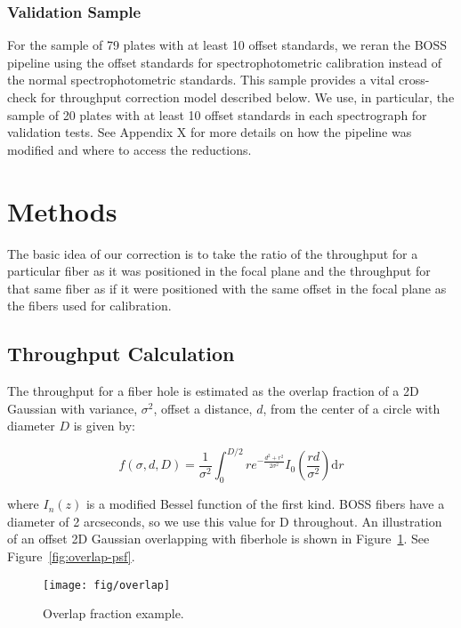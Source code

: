 \documentclass{emulateapj}
\providecommand{\fig}[1]{Figure~\ref{fig:#1}}
\begin{document}
\subsubsection{Validation Sample}

For the sample of 79 plates with at least 10 offset standards, we reran the BOSS pipeline using the offset standards for spectrophotometric calibration instead of the normal spectrophotometric standards. This sample provides a vital cross-check for throughput correction model described below. We use, in particular, the sample of 20 plates with at least 10 offset standards in each spectrograph for validation tests. See Appendix X for more details on how the pipeline was modified and where to access the reductions.

\section{Methods}

The basic idea of our correction is to take the ratio of the throughput for a particular fiber as it was positioned in the focal plane and the throughput for that same fiber as if it were positioned with the same offset in the focal plane as the fibers used for calibration.

\subsection{Throughput Calculation}

The throughput for a fiber hole is estimated as the overlap fraction of a 2D Gaussian with variance, $\sigma^2$, offset a distance, $d$, from the center of a circle with diameter $D$ is given by:

\begin{equation}
\label{eq:overlap}
f(\sigma,d,D) = \frac{1}{\sigma ^2}\int_{0}^{D/2}  r e^{-\frac{d^2+r^2}{2 \sigma ^2}} I_{0}\left(\frac{r d}{\sigma ^2}\right) \mathrm{d}r
\end{equation}

where $I_n(z)$ is a modified Bessel function of the first kind. BOSS fibers have a diameter of 2 arcseconds, so we use this value for D throughout. An illustration of an offset 2D Gaussian overlapping with fiberhole is shown in \fig{overlap-demo}. See \fig{overlap-psf}.

\begin{figure}
\centering
\texttt{[image: fig/overlap]}
\caption{Overlap fraction example.}
\label{fig:overlap-demo}
\end{figure}
\end{document}

